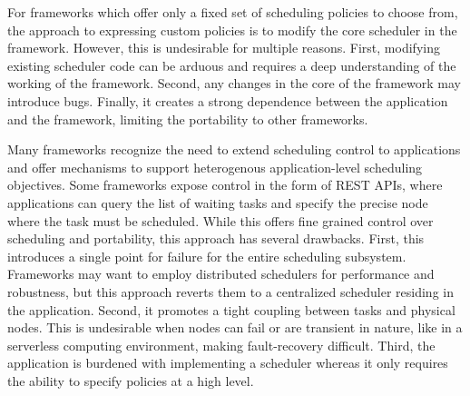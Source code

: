  
For frameworks which offer only a fixed set of scheduling policies to choose from, the approach to expressing custom policies is to modify the core scheduler in the framework. However, this is undesirable for multiple reasons. First, modifying existing scheduler code can be arduous and requires a deep understanding of the working of the framework. Second, any changes in the core of the framework may introduce bugs. Finally, it creates a strong dependence between the application and the framework, limiting the portability to other frameworks.

Many frameworks recognize the need to extend scheduling control to applications and offer mechanisms to support heterogenous application-level scheduling objectives. Some frameworks \cite{kubernetes} expose control in the form of REST APIs, where applications can query the list of waiting tasks and specify the precise node where the task must be scheduled. While this offers fine grained control over scheduling and portability, this approach has several drawbacks. First, this introduces a single point for failure for the entire scheduling subsystem. Frameworks may want to employ distributed schedulers for performance and robustness, but this approach reverts them to a centralized scheduler residing in the application. Second, it promotes a tight coupling between tasks and physical nodes. This is undesirable when nodes can fail or are transient in nature, like in a serverless computing environment, making fault-recovery difficult. Third, the application is burdened with implementing a scheduler whereas it only requires the ability to specify policies at a high level.

